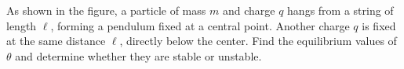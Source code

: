 As shown in the figure, a particle of mass $m$ and charge $q$ hangs from a string of length $\ell$, forming
a pendulum fixed at a central point. Another charge $q$ is fixed at the same distance $\ell$,
directly below the center. Find the equilibrium values of $\theta$ and determine whether they
are stable or unstable.

